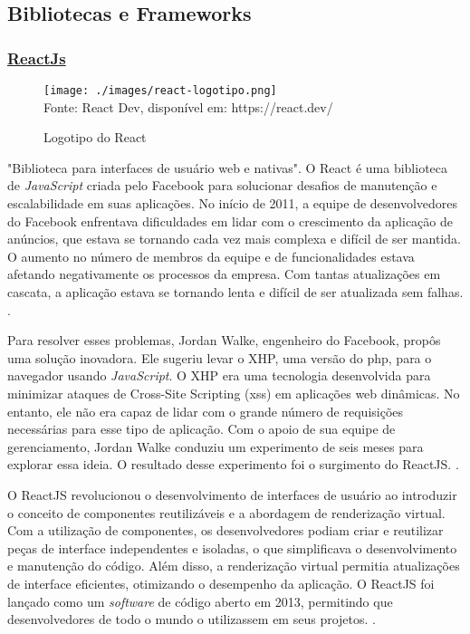 \subsection{Bibliotecas e Frameworks}

\subsubsection{\underline{ReactJs}}

\begin{figure}[H]
    \centering
    \caption{Logotipo do React}
    \texttt{[image: ./images/react-logotipo.png]}
    \label{fig:react-logotipo} \\
    \textnormal{\fontsize{10pt}{12pt}Fonte: React Dev, disponível em: https://react.dev/}
\end{figure}

"Biblioteca para interfaces de usuário \acrshort{web} e nativas".
O React é uma biblioteca de \textit{JavaScript} criada pelo Facebook para solucionar
desafios de manutenção e escalabilidade em suas aplicações. No início de 2011, a equipe de
desenvolvedores do Facebook enfrentava dificuldades em lidar com o crescimento da
aplicação de anúncios, que estava se tornando cada vez mais complexa e difícil de ser
mantida. O aumento no número de membros da equipe e de funcionalidades estava afetando
negativamente os processos da empresa. Com tantas atualizações em cascata, a aplicação
estava se tornando lenta e difícil de ser atualizada sem falhas.
\cite{morais-react}.

Para resolver esses problemas, Jordan Walke, engenheiro do Facebook, propôs uma
solução inovadora. Ele sugeriu levar o 
XHP,
uma versão do
\acrshort{php},
para o navegador usando
\textit{JavaScript}. O 
XHP
era uma tecnologia desenvolvida para minimizar ataques de Cross-Site
Scripting
(\acrshort{xss})
em aplicações
\acrshort{web}
dinâmicas. No entanto, ele não era capaz de lidar com o
grande número de requisições necessárias para esse tipo de aplicação. Com o apoio de sua
equipe de gerenciamento, Jordan Walke conduziu um experimento de seis meses para
explorar essa ideia. O resultado desse experimento foi o surgimento do ReactJS.
\cite{morais-react}.

O ReactJS revolucionou o desenvolvimento de interfaces de usuário ao introduzir o
conceito de componentes reutilizáveis e a abordagem de renderização virtual. Com a
utilização de componentes, os desenvolvedores podiam criar e reutilizar peças de interface
independentes e isoladas, o que simplificava o desenvolvimento e manutenção do código.
Além disso, a renderização virtual permitia atualizações de interface eficientes, otimizando o
desempenho da aplicação. O ReactJS foi lançado como um \textit{software} de código aberto em
2013, permitindo que desenvolvedores de todo o mundo o utilizassem em seus projetos.
\cite{morais-react}.

